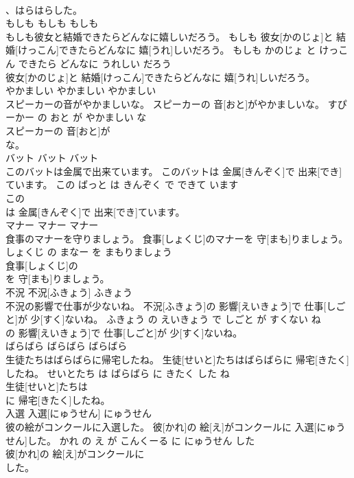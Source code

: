 \documentclass[8pt]{extreport}
\begin{document}
\begin{CJK}{UTF8}{min}
\\	、はらはらした。			
\\	もしも	もしも	もしも	
\\	もしも彼女と結婚できたらどんなに嬉しいだろう。	もしも 彼女[かのじょ]と 結婚[けっこん]できたらどんなに 嬉[うれ]しいだろう。	もしも かのじょ と けっこん できたら どんなに うれしい だろう	
\\	彼女[かのじょ]と 結婚[けっこん]できたらどんなに 嬉[うれ]しいだろう。			
\\	やかましい	やかましい	やかましい	
\\	スピーカーの音がやかましいな。	スピーカーの 音[おと]がやかましいな。	すぴーかー の おと が やかましい な	
\\	スピーカーの 音[おと]が
\\	な。			
\\	バット	バット	バット	
\\	このバットは金属で出来ています。	このバットは 金属[きんぞく]で 出来[でき]ています。	この ばっと は きんぞく で できて います	
\\	この
\\	は 金属[きんぞく]で 出来[でき]ています。			
\\	マナー	マナー	マナー	
\\	食事のマナーを守りましょう。	食事[しょくじ]のマナーを 守[まも]りましょう。	しょくじ の まなー を まもりましょう	
\\	食事[しょくじ]の
\\	を 守[まも]りましょう。			
\\	不況	不況[ふきょう]	ふきょう	
\\	不況の影響で仕事が少ないね。	不況[ふきょう]の 影響[えいきょう]で 仕事[しごと]が 少[すく]ないね。	ふきょう の えいきょう で しごと が すくない ね	
\\	の 影響[えいきょう]で 仕事[しごと]が 少[すく]ないね。			
\\	ばらばら	ばらばら	ばらばら	
\\	生徒たちはばらばらに帰宅したね。	生徒[せいと]たちはばらばらに 帰宅[きたく]したね。	せいとたち は ばらばら に きたく した ね	
\\	生徒[せいと]たちは
\\	に 帰宅[きたく]したね。			
\\	入選	入選[にゅうせん]	にゅうせん	
\\	彼の絵がコンクールに入選した。	彼[かれ]の 絵[え]がコンクールに 入選[にゅうせん]した。	かれ の え が こんくーる に にゅうせん した	
\\	彼[かれ]の 絵[え]がコンクールに
\\	した。			

\end{CJK}
\end{document}
